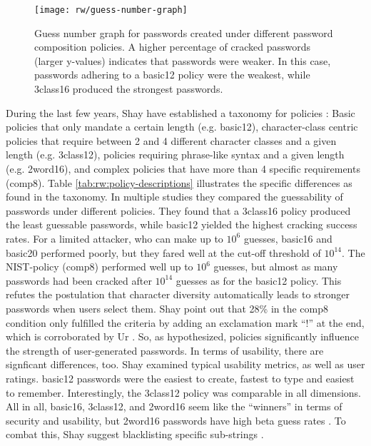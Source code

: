 	\begin{figure}[!htbp]
		\centering
		\texttt{[image: rw/guess-number-graph]}
		\caption{\label{fig:rw:guess-number-graph} Guess number graph for passwords created under different password composition policies. A higher percentage of cracked passwords (larger y-values) indicates that passwords were weaker. In this case, passwords adhering to a basic12 policy were the weakest, while 3class16 produced the strongest passwords.}
	\end{figure}
	During the last few years, Shay \etal have established a taxonomy for policies \cite{Komanduri2011OfPasswordsAndPeople, Shay2014CanLongPasswordsBeSecureAndUsable,Shay2016DesigningPasswordPolicies}: Basic policies that only mandate a certain length (e.g. basic12), character-class centric policies that require between 2 and 4 different character classes and a given length (e.g. 3class12), policies requiring phrase-like syntax and a given length (e.g. 2word16), and complex policies that have more than 4 specific requirements (comp8). Table \ref{tab:rw:policy-descriptions} illustrates the specific differences as found in the taxonomy. In multiple studies they compared the guessability of passwords under different policies. They found that a 3class16 policy produced the least guessable passwords, while basic12 yielded the highest cracking success rates. For a limited attacker, who can make up to $10^6$ guesses, basic16 and basic20 performed poorly, but they fared well at the cut-off threshold of $10^{14}$. The NIST-policy (comp8) performed well up to $10^6$ guesses, but almost as many passwords had been cracked after $10^{14}$ guesses as for the basic12 policy. This refutes the postulation that character diversity automatically leads to stronger passwords when users select them. Shay \etal point out that 28\% in the comp8 condition only fulfilled the criteria by adding an exclamation mark ``!'' at the end, which is corroborated by Ur \etal \cite{Ur2015PWCreationLab}. So, as hypothesized, policies significantly influence the strength of user-generated passwords. In terms of usability, there are signficant differences, too. Shay \etal examined typical usability metrics, as well as user ratings. basic12 passwords were the easiest to create, fastest to type and easiest to remember. Interestingly, the 3class12 policy was comparable in all dimensions. All in all, basic16, 3class12, and 2word16 seem like the ``winners'' in terms of security and usability, but 2word16 passwords have high beta guess rates \cite{Shay2014CanLongPasswordsBeSecureAndUsable}. To combat this, Shay \etal suggest blacklisting specific sub-strings \cite{Shay2016DesigningPasswordPolicies}.
		
